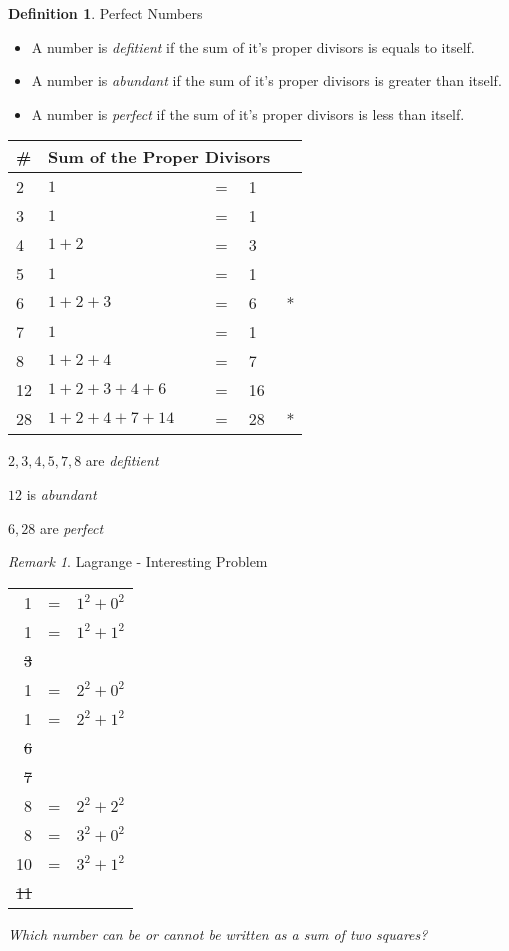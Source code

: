 \documentclass[fleqn,letterpaper,10pt,twoside]{report}
\theoremstyle{plain}
\theoremstyle{definition}
\newtheorem{definition}{Definition}[section]
\theoremstyle{remark}
\newtheorem*{remark}{Remark}
\begin{document}
\begin{definition}{Perfect Numbers}

   \begin{itemize}
      \item{A number is \textit{defitient} if the sum of it's proper divisors
         is equals to itself.}
      \item{A number is \textit{abundant} if the sum of it's proper divisors
         is greater than itself.}
      \item{A number is \textit{perfect} if the sum of it's proper divisors
         is less than itself.}
   \end{itemize}

   \begin{tabular}{l|llll}
      \#     &  \multicolumn{3}{c}{Sum of the Proper Divisors} & \\ \hline
      2     &  \(1\) &  =  &  1 & \\
      3     &  \(1\) &  =  &  1 & \\
      4     &  \(1 + 2\) &  =  &  3 & \\
      5     &  \(1\) &  =  &  1 & \\
      6     &  \(1 + 2 + 3\) &  =  &  6 & * \\
      7     &  \(1\) &  =  &  1 & \\
      8     &  \(1 + 2 + 4\) &  =  &  7 & \\
      12    &  \(1 + 2 + 3 + 4 + 6\) &  =  &  16 & \\
      28    &  \(1 + 2 + 4 + 7 + 14\) &  =  &  28 & * \\
   \end{tabular}

   \(2,3,4,5,7,8\) are \textit{defitient}

   \(12\) is \textit{abundant}

   \(6,28\) are \textit{perfect}

\end{definition}

\begin{remark}{Lagrange - Interesting Problem}

\begin{tabular}{rcl}
  1 & = & \(1^2 + 0^2\) \\
  1 & = & \(1^2 + 1^2\) \\
   \sout{3} & & \\
  1 & = & \(2^2 + 0^2\) \\
  1 & = & \(2^2 + 1^2\) \\
   \sout{6} & & \\
   \sout{7} & & \\
  8 & = & \(2^2 + 2^2\) \\
  8 & = & \(3^2 + 0^2\) \\
  10 & = & \(3^2 + 1^2\) \\
   \sout{11} & & \\
\end{tabular}

\textit{Which number can be or cannot be written as a sum of two squares?}

\end{remark}
\end{document}
